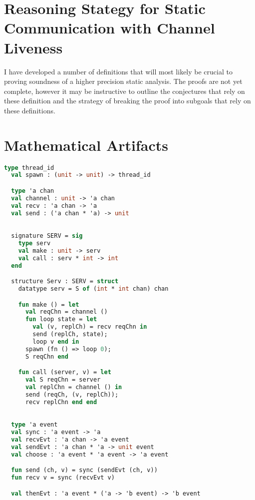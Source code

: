 \section{Reasoning Stategy for Static Communication with Channel Liveness}
I have developed a number of definitions that will most likely be crucial to proving soundness
of a higher precision static analysis.  The proofs are not yet complete, however it may be
instructive to outline the conjectures that rely on these definition and the strategy of
breaking the proof into subgoals that rely on these definitions.






\section{Mathematical Artifacts}

\begin{lstlisting}[language=ML, style=codestyle1]
  type thread_id
  val spawn : (unit -> unit) -> thread_id

  type 'a chan
  val channel : unit -> 'a chan
  val recv : 'a chan -> 'a
  val send : ('a chan * 'a) -> unit
  \end{lstlisting}

\begin{lstlisting}[language=ML, style=codestyle1]

  signature SERV = sig 
    type serv
    val make : unit -> serv
    val call : serv * int -> int
  end

  structure Serv : SERV = struct 
    datatype serv = S of (int * int chan) chan 

    fun make () = let 
      val reqChn = channel ()
      fun loop state = let
        val (v, replCh) = recv reqChn in 
        send (replCh, state);
        loop v end in
      spawn (fn () => loop 0);
      S reqChn end 

    fun call (server, v) = let 
      val S reqChn = server
      val replChn = channel () in 
      send (reqCh, (v, replCh));
      recv replChn end end

  \end{lstlisting}

\begin{lstlisting}[language=ML, style=codestyle1]

  type 'a event
  val sync : 'a event -> 'a
  val recvEvt : 'a chan -> 'a event
  val sendEvt : 'a chan * 'a -> unit event
  val choose : 'a event * 'a event -> 'a event

  fun send (ch, v) = sync (sendEvt (ch, v))
  fun recv v = sync (recvEvt v)

  val thenEvt : 'a event * ('a -> 'b event) -> 'b event

  \end{lstlisting}

